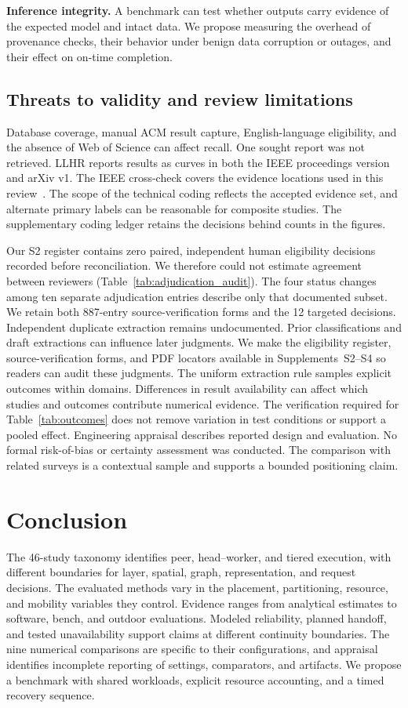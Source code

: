 \documentclass[pdflatex,sn-vancouver-num]{sn-jnl}
\begin{document}
\textbf{Inference integrity.}
A benchmark can test whether outputs carry evidence of the expected model and intact data. We propose measuring the overhead of provenance checks, their behavior under benign data corruption or outages, and their effect on on-time completion.

\subsection{Threats to validity and review limitations}
Database coverage, manual ACM result capture, English-language eligibility, and the absence of Web of Science can affect recall. One sought report was not retrieved. LLHR reports results as curves in both the IEEE proceedings version and arXiv v1. The IEEE cross-check covers the evidence locations used in this review~\cite{R0082}. The scope of the technical coding reflects the accepted evidence set, and alternate primary labels can be reasonable for composite studies. The supplementary coding ledger retains the decisions behind counts in the figures.

Our S2 register contains zero paired, independent human eligibility decisions recorded before reconciliation. We therefore could not estimate agreement between reviewers (Table~\ref{tab:adjudication_audit}). The four status changes among ten separate adjudication entries describe only that documented subset. We retain both 887-entry source-verification forms and the 12 targeted decisions. Independent duplicate extraction remains undocumented. Prior classifications and draft extractions can influence later judgments. We make the eligibility register, source-verification forms, and PDF locators available in Supplements~S2--S4 so readers can audit these judgments. The uniform extraction rule samples explicit outcomes within domains. Differences in result availability can affect which studies and outcomes contribute numerical evidence. The verification required for Table~\ref{tab:outcomes} does not remove variation in test conditions or support a pooled effect. Engineering appraisal describes reported design and evaluation. No formal risk-of-bias or certainty assessment was conducted. The comparison with related surveys is a contextual sample and supports a bounded positioning claim.

\section{Conclusion}\label{sec:conclusion}
The 46-study taxonomy identifies peer, head--worker, and tiered execution, with different boundaries for layer, spatial, graph, representation, and request decisions. The evaluated methods vary in the placement, partitioning, resource, and mobility variables they control. Evidence ranges from analytical estimates to software, bench, and outdoor evaluations. Modeled reliability, planned handoff, and tested unavailability support claims at different continuity boundaries. The nine numerical comparisons are specific to their configurations, and appraisal identifies incomplete reporting of settings, comparators, and artifacts. We propose a benchmark with shared workloads, explicit resource accounting, and a timed recovery sequence.
\end{document}
